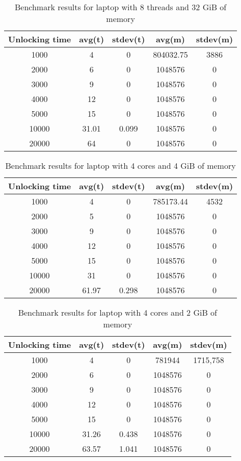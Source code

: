 \documentclass[nolof]{fithesis3}
\begin{document}
\noindent
\begin{table}
\caption{Benchmark results for laptop with 8 threads and 32 GiB of memory}
\label{tab:l8c32g}
\begin{tabularx}{\textwidth}{| c | c | c | c | c |}
\hline
Unlocking time & avg(t) & stdev(t) & avg(m) & stdev(m)\\
\hline
1000 & 4 & 0 & 804032.75 & 3886\\
\hline
2000 & 6 & 0 & 1048576 & 0\\
\hline
3000 & 9 & 0 & 1048576 & 0\\
\hline
4000 & 12 & 0 & 1048576 & 0\\
\hline
5000 & 15 & 0 & 1048576 & 0\\
\hline
10000 & 31.01 & 0.099 & 1048576 & 0\\
\hline
20000 & 64 & 0 & 1048576 & 0\\
\hline
\end{tabularx}
\end{table}

\noindent
\begin{table}
\caption{Benchmark results for laptop with 4 cores and 4 GiB of memory}
\label{tab:l4c4g}
\begin{tabularx}{\textwidth}{| c | c | c | c | c |}
\hline
Unlocking time & avg(t) & stdev(t) & avg(m) & stdev(m)\\
\hline
1000 & 4 & 0 & 785173.44 & 4532\\
\hline
2000 & 5 & 0 & 1048576 & 0\\
\hline
3000 & 9 & 0 & 1048576 & 0\\
\hline
4000 & 12 & 0 & 1048576 & 0\\
\hline
5000 & 15 & 0 & 1048576 & 0\\
\hline
10000 & 31 & 0 & 1048576 & 0\\
\hline
20000 & 61.97 & 0.298 & 1048576 & 0\\
\hline
\end{tabularx}
\end{table}

\noindent
\begin{table}
\caption{Benchmark results for laptop with 4 cores and 2 GiB of memory}
\label{tab:l4c2g}
\begin{tabularx}{\textwidth}{| c | c | c | c | c |}
\hline
Unlocking time & avg(t) & stdev(t) & avg(m) & stdev(m)\\
\hline
1000 & 4 & 0 & 781944 & 1715,758\\
\hline
2000 & 6 & 0 & 1048576 & 0\\
\hline
3000 & 9 & 0 & 1048576 & 0\\
\hline
4000 & 12 & 0 & 1048576 & 0\\
\hline
5000 & 15 & 0 & 1048576 & 0\\
\hline
10000 & 31.26 & 0.438 & 1048576 & 0\\
\hline
20000 & 63.57 & 1.041 & 1048576 & 0\\
\hline
\end{tabularx}
\end{table}
\end{document}
